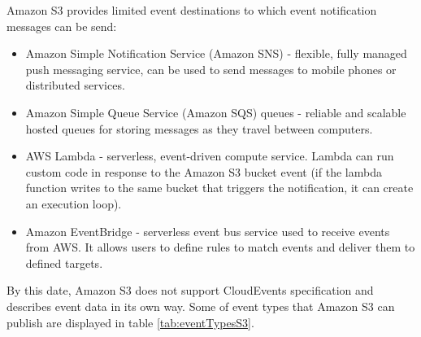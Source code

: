     Amazon S3 provides limited event destinations to which event notification messages can be send\cite{eventS3EventNotificationDest}:
    \begin{itemize}
        \item Amazon Simple Notification Service (Amazon SNS) - flexible, fully managed push messaging service, can be used to send messages to mobile phones or distributed services.
        \item Amazon Simple Queue Service (Amazon SQS) queues - reliable and scalable hosted queues for storing messages as they travel between computers.
        \item AWS Lambda - serverless, event-driven compute service. Lambda can run custom code in response to the Amazon S3 bucket event (if the lambda function writes to the same bucket that triggers the notification, it can create an execution loop).
        \item Amazon EventBridge - serverless event bus service used to receive events from AWS. It allows users to define rules to match events and deliver them to defined targets.
    \end{itemize}

    By this date, Amazon S3 does not support CloudEvents specification and describes event data in its own way. Some of event types that Amazon S3 can publish are displayed in table \ref{tab:eventTypesS3}.


